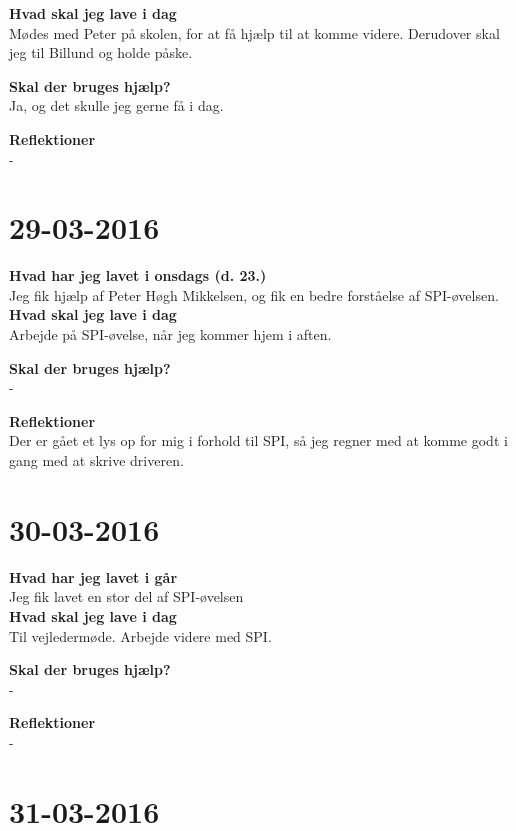 \documentclass{article}
\begin{document}
	\textbf{Hvad skal jeg lave i dag}\\
	Mødes med Peter på skolen, for at få hjælp til at komme videre. Derudover skal jeg til Billund og holde påske.    
	
	\textbf{Skal der bruges hjælp?}\\
	Ja, og det skulle jeg gerne få i dag.
	
	\textbf{Reflektioner}\\
	- 
	

	\section{29-03-2016}
	
	\textbf{Hvad har jeg lavet i onsdags (d. 23.)}\\
	Jeg fik hjælp af Peter Høgh Mikkelsen, og fik en bedre forståelse af SPI-øvelsen.\\
	
	\textbf{Hvad skal jeg lave i dag}\\
	Arbejde på SPI-øvelse, når jeg kommer hjem i aften.     
	
	\textbf{Skal der bruges hjælp?}\\
	-
	
	\textbf{Reflektioner}\\
	Der er gået et lys op for mig i forhold til SPI, så jeg regner med at komme godt i gang med at skrive driveren.
	
	
	
	\section{30-03-2016}
	
	\textbf{Hvad har jeg lavet i går}\\
	Jeg fik lavet en stor del af SPI-øvelsen\\
	
	\textbf{Hvad skal jeg lave i dag}\\
	Til vejledermøde. Arbejde videre med SPI.
	
	\textbf{Skal der bruges hjælp?}\\
	-
	
	\textbf{Reflektioner}\\
	-	
	
	
	
	\section{31-03-2016}
	
\end{document}
